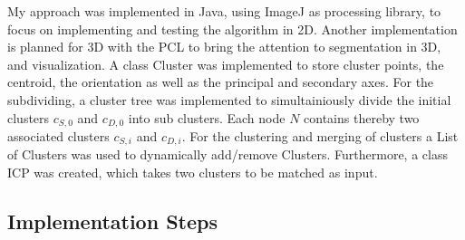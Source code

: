 \documentclass[a4paper,english,11pt]{report}
\begin{document}
My approach was implemented in Java, using ImageJ as processing library, to focus on implementing and testing the algorithm in 2D. Another implementation is planned for 3D with the PCL to bring the attention to segmentation in 3D, and visualization. A class Cluster was implemented to store cluster points, the centroid, the orientation as well as the principal and secondary axes. For the subdividing, a cluster tree was implemented to simultainiously divide the initial clusters $c_{S, 0}$ and $c_{D, 0}$ into sub clusters. Each node $N$ contains thereby two associated clusters $c_{S, i}$ and $c_{D, i}$. For the clustering and merging of clusters a List of Clusters was used to dynamically add/remove Clusters. Furthermore, a class ICP was created, which takes two clusters to be matched as input.

\subsection{Implementation Steps}
\end{document}
